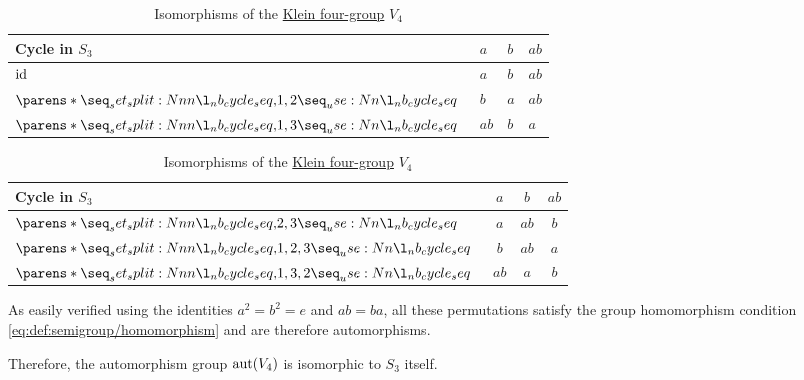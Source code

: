 \begin{example}
\begin{thmenum}
    \begin{table}[!ht]
      \begin{center}
        \begin{tabular}{l l l l}
          \toprule
          Cycle in \( S_3 \)   & \( a \)  & \( b \)  & \( ab \)  \\
          \midrule
          \( \operatorname{id} \)            & \( a \)  & \( b \)  & \( ab \)  \\
          \( \cycle{ 1, 2 } \) & \( b \)  & \( a \)  & \( ab \)  \\
          \( \cycle{ 1, 3 } \) & \( ab \) & \( b \)  & \( a \) \\
          \bottomrule
        \end{tabular}
        \quad
        \begin{tabular}{l c c c}
          \toprule
          Cycle in \( S_3 \)      & \( a \)  & \( b \)  & \( ab \) \\
          \midrule
          \( \cycle{ 2, 3 } \)    & \( a \)  & \( ab \) & \( b \)  \\
          \( \cycle{ 1, 2, 3 } \) & \( b \)  & \( ab \) & \( a \)  \\
          \( \cycle{ 1, 3, 2 } \) & \( ab \) & \( a \)  & \( b \)  \\
          \bottomrule
        \end{tabular}
      \end{center}
      \caption{Isomorphisms of the \hyperref[def:klein_four_group]{Klein four-group} \( V_4 \)}\label{tab:ex:def:automorphism_group/v4}
    \end{table}

    As easily verified using the identities \( a^2 = b^2 = e \) and \( ab = ba \), all these permutations satisfy the group homomorphism condition \eqref{eq:def:semigroup/homomorphism} and are therefore automorphisms.

    Therefore, the automorphism group \( \operatorname{aut}(V_4) \) is isomorphic to \( S_3 \) itself.
  \end{thmenum}
\end{example}

